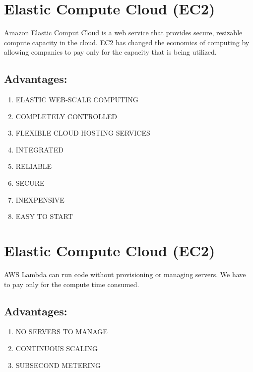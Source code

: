 \section{Elastic Compute Cloud (EC2)}
Amazon Elastic Comput Cloud is a web service that provides secure, resizable compute capacity in the cloud. EC2 has changed the economics of computing by allowing companies to pay only for the capacity that is being utilized.

\subsection{Advantages:}
\begin{enumerate}
	\item ELASTIC WEB-SCALE COMPUTING
	\item COMPLETELY CONTROLLED
	\item FLEXIBLE CLOUD HOSTING SERVICES
	\item INTEGRATED
	\item RELIABLE
	\item SECURE
	\item INEXPENSIVE
	\item EASY TO START
\end{enumerate}

\section{Elastic Compute Cloud (EC2)}
AWS Lambda can run code without provisioning or managing servers. We have to pay only for the compute time consumed.

\subsection{Advantages:}
\begin{enumerate}
	\item NO SERVERS TO MANAGE
	\item CONTINUOUS SCALING
	\item SUBSECOND METERING
\end{enumerate}